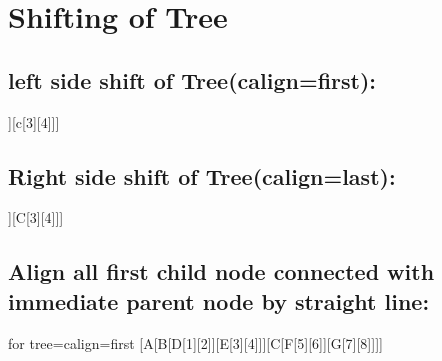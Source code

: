 \documentclass{article}
\begin{document}
	\section{Shifting of Tree}
		\subsection{left side shift of Tree(calign=first):}
		\begin{forest}
			[A,calign=first[B[1][2]][c[3][4]]]
		\end{forest}
		
		\subsection{Right side shift of Tree(calign=last):}
		\begin{forest}
			[A,calign=last[B[1][2]][C[3][4]]]
		\end{forest}
		
		\subsection{Align all first child node connected with immediate parent node by straight line:}
		\begin{forest} for tree={calign=first}
			[A[B[D[1][2]][E[3][4]]][C[F[5][6]][G[7][8]]]]
		\end{forest}	
		
\end{document}
